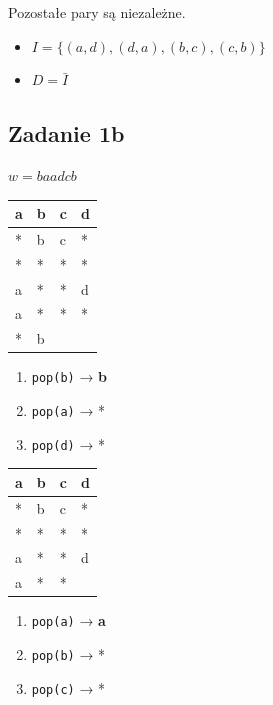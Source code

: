 \documentclass[11pt]{article}
\providecommand{\tightlist}{%
      \setlength{\itemsep}{0pt}\setlength{\parskip}{0pt}}
\begin{document}
Pozostałe pary są niezależne.

\begin{itemize}
\tightlist
\item
  \(I = \{(a, d), (d, a), (b, c), (c, b)\}\)
\item
  \(D = \bar{I}\)
\end{itemize}

    \hypertarget{zadanie-1b}{%
\subsection{Zadanie 1b}\label{zadanie-1b}}

\(w = baadcb\)

\begin{longtable}[]{@{}llll@{}}
\toprule\noalign{}
a & b & c & d \\
\midrule\noalign{}
\endhead
\bottomrule\noalign{}
\endlastfoot
* & b & c & * \\
* & * & * & * \\
a & * & * & d \\
a & * & * & * \\
* & b & & \\
\end{longtable}

\begin{enumerate}
\def\labelenumi{\arabic{enumi}.}
\tightlist
\item
  \texttt{pop(b)} → \textbf{b}
\item
  \texttt{pop(a)} → *
\item
  \texttt{pop(d)} → *
\end{enumerate}

\begin{longtable}[]{@{}llll@{}}
\toprule\noalign{}
a & b & c & d \\
\midrule\noalign{}
\endhead
\bottomrule\noalign{}
\endlastfoot
* & b & c & * \\
* & * & * & * \\
a & * & * & d \\
a & * & * & \\
\end{longtable}

\begin{enumerate}
\def\labelenumi{\arabic{enumi}.}
\tightlist
\item
  \texttt{pop(a)} → \textbf{a}
\item
  \texttt{pop(b)} → *
\item
  \texttt{pop(c)} → *
\end{enumerate}
\end{document}
